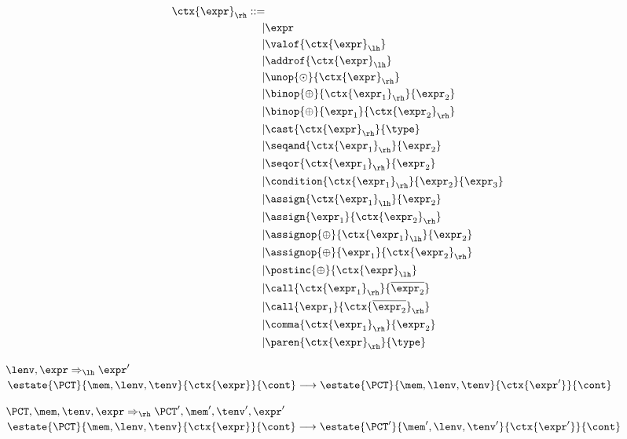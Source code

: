 \documentclass{article}
\begin{document}
\[\begin{aligned}
\ctx{\expr}_\rh ::= \\
| & \expr & \\ %
| & \valof{\ctx{\expr}_\lh} \\ %
| & \addrof{\ctx{\expr}_\lh} \\ %
| & \unop{\odot}{\ctx{\expr}_\rh} \\ %
| & \binop{\oplus}{\ctx{\expr_1}_\rh}{\expr_2} \\ %
| & \binop{\oplus}{\expr_1}{\ctx{\expr_2}_\rh} \\ %
| & \cast{\ctx{\expr}_\rh}{\type} \\ %
| & \seqand{\ctx{\expr_1}_\rh}{\expr_2} \\ %
| & \seqor{\ctx{\expr_1}_\rh}{\expr_2} \\ %
| & \condition{\ctx{\expr_1}_\rh}{\expr_2}{\expr_3} \\ %
| & \assign{\ctx{\expr_1}_\lh}{\expr_2} \\ %
| & \assign{\expr_1}{\ctx{\expr_2}_\rh} \\ %
| & \assignop{\oplus}{\ctx{\expr_1}_\lh}{\expr_2} \\ %
| & \assignop{\oplus}{\expr_1}{\ctx{\expr_2}_\rh} \\ %
| & \postinc{\oplus}{\ctx{\expr}_\lh} \\ %
| & \call{\ctx{\expr_1}_\rh}{\overline{\expr_2}} \\ %
| & \call{\expr_1}{\ctx{\overline{\expr_2}}_\rh} \\ %
| & \comma{\ctx{\expr_1}_\rh}{\expr_2} \\ %
| & \paren{\ctx{\expr}_\rh}{\type} \\ %
\end{aligned}\]

\judgmenttwo{\(\ctx{\expr}_\lh\)}
            {\(\lenv,\expr \Rightarrow_\lh \expr'\)}
            {\(\estate{\PCT}{\mem,\lenv,\tenv}{\ctx{\expr}}{\cont} \longrightarrow
              \estate{\PCT}{\mem,\lenv,\tenv}{\ctx{\expr'}}{\cont}\)}

\judgmenttwo{\(\ctx{\expr}_\rh\)}
            {\(\PCT, \mem, \tenv, \expr \Rightarrow_\rh \PCT', \mem', \tenv', \expr'\)}
            {\(\estate{\PCT}{\mem,\lenv,\tenv}{\ctx{\expr}}{\cont} \longrightarrow
              \estate{\PCT'}{\mem',\lenv,\tenv'}{\ctx{\expr'}}{\cont}\)}
\end{document}
